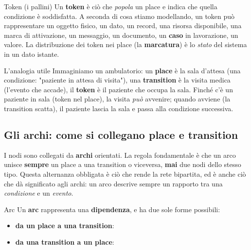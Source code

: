 \begin{boxdefinition}{Token (i pallini)}
Un \textbf{token} è ciò che \emph{popola} un place e indica che quella condizione è soddisfatta. A seconda di cosa stiamo modellando, un token può rappresentare un oggetto fisico, un dato, un record, una risorsa disponibile, una marca di attivazione, un messaggio, un documento, un \textbf{caso} in lavorazione, un valore. La distribuzione dei token nei place (la \textbf{marcatura}) è lo \emph{stato} del sistema in un dato istante.
\end{boxdefinition}

\begin{boxtip}{L'analogia utile}
Immaginiamo un ambulatorio: un \textbf{place} è la sala d'attesa (una condizione: "paziente in attesa di visita"), una \textbf{transition} è la visita medica (l'evento che accade), il \textbf{token} è il paziente che occupa la sala. Finché c'è un paziente in sala (token nel place), la visita \emph{può} avvenire; quando avviene (la transition scatta), il paziente lascia la sala e passa alla condizione successiva.
\end{boxtip}

\subsection{\texorpdfstring{Gli archi: come si collegano place e transition}{Gli archi: come si collegano place e transition}}

I nodi sono collegati da \textbf{archi} orientati. La regola fondamentale è che un arco unisce \textbf{sempre} un place a una transition o viceversa, \textbf{mai} due nodi dello stesso tipo. Questa alternanza obbligata è ciò che rende la rete bipartita, ed è anche ciò che dà significato agli archi: un arco descrive sempre un rapporto tra una \emph{condizione} e un \emph{evento}.

\begin{boxdefinition}{Arc}
Un \textbf{arc} rappresenta una \textbf{dipendenza}, e ha due sole forme possibili:

\begin{itemize}
\item \textbf{da un place a una transition}:
\end{itemize}

\begin{itemize}
\item \textbf{da una transition a un place}:
\end{itemize}
\end{boxdefinition}

